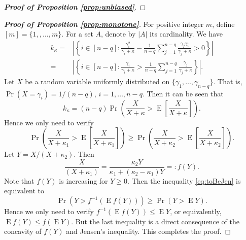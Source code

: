 \documentclass[11pt]{article}
\DeclareMathOperator{\myE}{E}
\theoremstyle{plain}
\theoremstyle{definition}
\theoremstyle{remark}
\begin{document}
\begin{appendices}
\begin{proof}[\textbf{Proof of Proposition \ref{prop:unbiased}}]
\end{proof}


\begin{proof}[\textbf{Proof of Proposition \ref{prop:monotone}}]
    For positive integer $m$, define $[m]=\{1,,\ldots, m\}$.
    For a set $A$, denote by $| A |$ its cardinality.
    We have
    \begin{equation*}
        \begin{split}
        k_{\kappa} =& \left|\left\{i\in [n-q]: \frac{\gamma_i^2}{\gamma_i +\kappa} - \frac{1}{n-q} \sum_{j=1}^{n-q}\frac{\gamma_j \gamma_i}{\gamma_j +\kappa}>0 \right\}\right|
        \\
        =& \left|\left\{i\in [n-q]: \frac{\gamma_i}{\gamma_i +\kappa} > \frac{1}{n-q} \sum_{j=1}^{n-q}\frac{\gamma_j }{\gamma_j +\kappa} \right\}\right|
        .
        \end{split}
    \end{equation*}
    Let $X$ be a random variable uniformly distributed on $\{\gamma_1,\ldots,\gamma_{n-q}\}$.
    That is, $\Pr(X=\gamma_i)=1/(n-q)$, $i=1,\ldots, n-q$.
    Then it can be seen that
    \begin{equation*}
        k_{\kappa}=(n-q) \Pr \left(\frac{X}{X+\kappa}>\myE \left[\frac{X}{X+\kappa}\right]\right).
    \end{equation*}
    Hence we only need to verify
    \begin{equation}\label{eq:toBeJen}
        \Pr \left(\frac{X}{X+\kappa_1}>\myE \left[\frac{X}{X+\kappa_1}\right]\right) 
\geq
\Pr \left(\frac{X}{X+\kappa_2}>\myE \left[\frac{X}{X+\kappa_2}\right]\right) .
    \end{equation}
    Let $Y=X/(X+\kappa_2)$.
    Then
    \begin{equation*}
        \frac{X}{(X+\kappa_1)} = \frac{\kappa_2 Y}{ \kappa_1 + (\kappa_2-\kappa_1) Y} =: f(Y).
    \end{equation*}
    Note that $f(Y)$ is increasing for $Y\geq 0$.
    Then the inequality \eqref{eq:toBeJen} is equivalent to
    \begin{equation*}
        \Pr \left(Y> f^{-1}\left(\myE f(Y)\right)\right) 
\geq
\Pr \left( Y >\myE Y\right) .
    \end{equation*}
    Hence we only need to verify
        $f^{-1}\left(\myE f(Y)\right)
        \leq
        \myE Y$, or equivalently, $\myE f(Y)
        \leq
        f(\myE Y)$.
        But the last inequality is a direct consequence of the concavity of $f(Y)$ and Jensen's inequality.
        This completes the proof.


\end{proof}
\end{appendices}
\end{document}
